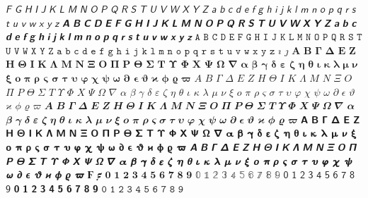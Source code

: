 $𝘍$
$𝘎$
$𝘏$
$𝘐$
$𝘑$
$𝘒$
$𝘓$
$𝘔$
$𝘕$
$𝘖$
$𝘗$
$𝘘$
$𝘙$
$𝘚$
$𝘛$
$𝘜$
$𝘝$
$𝘞$
$𝘟$
$𝘠$
$𝘡$
$𝘢$
$𝘣$
$𝘤$
$𝘥$
$𝘦$
$𝘧$
$𝘨$
$𝘩$
$𝘪$
$𝘫$
$𝘬$
$𝘭$
$𝘮$
$𝘯$
$𝘰$
$𝘱$
$𝘲$
$𝘳$
$𝘴$
$𝘵$
$𝘶$
$𝘷$
$𝘸$
$𝘹$
$𝘺$
$𝘻$
$𝘼$
$𝘽$
$𝘾$
$𝘿$
$𝙀$
$𝙁$
$𝙂$
$𝙃$
$𝙄$
$𝙅$
$𝙆$
$𝙇$
$𝙈$
$𝙉$
$𝙊$
$𝙋$
$𝙌$
$𝙍$
$𝙎$
$𝙏$
$𝙐$
$𝙑$
$𝙒$
$𝙓$
$𝙔$
$𝙕$
$𝙖$
$𝙗$
$𝙘$
$𝙙$
$𝙚$
$𝙛$
$𝙜$
$𝙝$
$𝙞$
$𝙟$
$𝙠$
$𝙡$
$𝙢$
$𝙣$
$𝙤$
$𝙥$
$𝙦$
$𝙧$
$𝙨$
$𝙩$
$𝙪$
$𝙫$
$𝙬$
$𝙭$
$𝙮$
$𝙯$
$𝙰$
$𝙱$
$𝙲$
$𝙳$
$𝙴$
$𝙵$
$𝙶$
$𝙷$
$𝙸$
$𝙹$
$𝙺$
$𝙻$
$𝙼$
$𝙽$
$𝙾$
$𝙿$
$𝚀$
$𝚁$
$𝚂$
$𝚃$
$𝚄$
$𝚅$
$𝚆$
$𝚇$
$𝚈$
$𝚉$
$𝚊$
$𝚋$
$𝚌$
$𝚍$
$𝚎$
$𝚏$
$𝚐$
$𝚑$
$𝚒$
$𝚓$
$𝚔$
$𝚕$
$𝚖$
$𝚗$
$𝚘$
$𝚙$
$𝚚$
$𝚛$
$𝚜$
$𝚝$
$𝚞$
$𝚟$
$𝚠$
$𝚡$
$𝚢$
$𝚣$
$𝚤$
$𝚥$
$𝚨$
$𝚩$
$𝚪$
$𝚫$
$𝚬$
$𝚭$
$𝚮$
$𝚯$
$𝚰$
$𝚱$
$𝚲$
$𝚳$
$𝚴$
$𝚵$
$𝚶$
$𝚷$
$𝚸$
$𝚹$
$𝚺$
$𝚻$
$𝚼$
$𝚽$
$𝚾$
$𝚿$
$𝛀$
$𝛁$
$𝛂$
$𝛃$
$𝛄$
$𝛅$
$𝛆$
$𝛇$
$𝛈$
$𝛉$
$𝛊$
$𝛋$
$𝛌$
$𝛍$
$𝛎$
$𝛏$
$𝛐$
$𝛑$
$𝛒$
$𝛓$
$𝛔$
$𝛕$
$𝛖$
$𝛗$
$𝛘$
$𝛙$
$𝛚$
$𝛛$
$𝛜$
$𝛝$
$𝛞$
$𝛟$
$𝛠$
$𝛡$
$𝛢$
$𝛣$
$𝛤$
$𝛥$
$𝛦$
$𝛧$
$𝛨$
$𝛩$
$𝛪$
$𝛫$
$𝛬$
$𝛭$
$𝛮$
$𝛯$
$𝛰$
$𝛱$
$𝛲$
$𝛳$
$𝛴$
$𝛵$
$𝛶$
$𝛷$
$𝛸$
$𝛹$
$𝛺$
$𝛻$
$𝛼$
$𝛽$
$𝛾$
$𝛿$
$𝜀$
$𝜁$
$𝜂$
$𝜃$
$𝜄$
$𝜅$
$𝜆$
$𝜇$
$𝜈$
$𝜉$
$𝜊$
$𝜋$
$𝜌$
$𝜍$
$𝜎$
$𝜏$
$𝜐$
$𝜑$
$𝜒$
$𝜓$
$𝜔$
$𝜕$
$𝜖$
$𝜗$
$𝜘$
$𝜙$
$𝜚$
$𝜛$
$𝜜$
$𝜝$
$𝜞$
$𝜟$
$𝜠$
$𝜡$
$𝜢$
$𝜣$
$𝜤$
$𝜥$
$𝜦$
$𝜧$
$𝜨$
$𝜩$
$𝜪$
$𝜫$
$𝜬$
$𝜭$
$𝜮$
$𝜯$
$𝜰$
$𝜱$
$𝜲$
$𝜳$
$𝜴$
$𝜵$
$𝜶$
$𝜷$
$𝜸$
$𝜹$
$𝜺$
$𝜻$
$𝜼$
$𝜽$
$𝜾$
$𝜿$
$𝝀$
$𝝁$
$𝝂$
$𝝃$
$𝝄$
$𝝅$
$𝝆$
$𝝇$
$𝝈$
$𝝉$
$𝝊$
$𝝋$
$𝝌$
$𝝍$
$𝝎$
$𝝏$
$𝝐$
$𝝑$
$𝝒$
$𝝓$
$𝝔$
$𝝕$
$𝝖$
$𝝗$
$𝝘$
$𝝙$
$𝝚$
$𝝛$
$𝝜$
$𝝝$
$𝝞$
$𝝟$
$𝝠$
$𝝡$
$𝝢$
$𝝣$
$𝝤$
$𝝥$
$𝝦$
$𝝧$
$𝝨$
$𝝩$
$𝝪$
$𝝫$
$𝝬$
$𝝭$
$𝝮$
$𝝯$
$𝝰$
$𝝱$
$𝝲$
$𝝳$
$𝝴$
$𝝵$
$𝝶$
$𝝷$
$𝝸$
$𝝹$
$𝝺$
$𝝻$
$𝝼$
$𝝽$
$𝝾$
$𝝿$
$𝞀$
$𝞁$
$𝞂$
$𝞃$
$𝞄$
$𝞅$
$𝞆$
$𝞇$
$𝞈$
$𝞉$
$𝞊$
$𝞋$
$𝞌$
$𝞍$
$𝞎$
$𝞏$
$𝞐$
$𝞑$
$𝞒$
$𝞓$
$𝞔$
$𝞕$
$𝞖$
$𝞗$
$𝞘$
$𝞙$
$𝞚$
$𝞛$
$𝞜$
$𝞝$
$𝞞$
$𝞟$
$𝞠$
$𝞡$
$𝞢$
$𝞣$
$𝞤$
$𝞥$
$𝞦$
$𝞧$
$𝞨$
$𝞩$
$𝞪$
$𝞫$
$𝞬$
$𝞭$
$𝞮$
$𝞯$
$𝞰$
$𝞱$
$𝞲$
$𝞳$
$𝞴$
$𝞵$
$𝞶$
$𝞷$
$𝞸$
$𝞹$
$𝞺$
$𝞻$
$𝞼$
$𝞽$
$𝞾$
$𝞿$
$𝟀$
$𝟁$
$𝟂$
$𝟃$
$𝟄$
$𝟅$
$𝟆$
$𝟇$
$𝟈$
$𝟉$
$𝟊$
$𝟋$
$𝟎$
$𝟏$
$𝟐$
$𝟑$
$𝟒$
$𝟓$
$𝟔$
$𝟕$
$𝟖$
$𝟗$
$𝟘$
$𝟙$
$𝟚$
$𝟛$
$𝟜$
$𝟝$
$𝟞$
$𝟟$
$𝟠$
$𝟡$
$𝟢$
$𝟣$
$𝟤$
$𝟥$
$𝟦$
$𝟧$
$𝟨$
$𝟩$
$𝟪$
$𝟫$
$𝟬$
$𝟭$
$𝟮$
$𝟯$
$𝟰$
$𝟱$
$𝟲$
$𝟳$
$𝟴$
$𝟵$
$𝟶$
$𝟷$
$𝟸$
$𝟹$
$𝟺$
$𝟻$
$𝟼$
$𝟽$
$𝟾$
$𝟿$